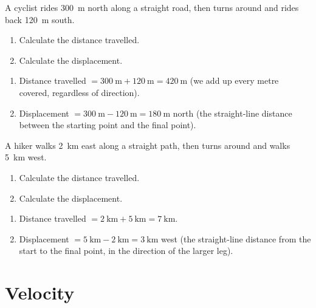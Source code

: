 \begin{exercise}
    A cyclist rides \qty{300}{\m} north along a straight road, then turns around and rides back \qty{120}{\m} south.
    \begin{enumerate}[label=\letraminuscula]
        \item Calculate the distance travelled.
        \item Calculate the displacement.
    \end{enumerate}
    \begin{solu}
        \begin{enumerate}[label=\alph*)]
            \item Distance travelled \(= \qty{300}{\m} + \qty{120}{\m} = \qty{420}{\m}\) (we add up every metre covered, regardless of direction).
            \item Displacement \(= \qty{300}{\m} - \qty{120}{\m} = \qty{180}{\m}\) north (the straight-line distance between the starting point and the final point).
        \end{enumerate}
    \end{solu}
\end{exercise}

\begin{exercise}
    A hiker walks \qty{2}{\km} east along a straight path, then turns around and walks \qty{5}{\km} west.
    \begin{enumerate}[label=\letraminuscula]
        \item Calculate the distance travelled.
        \item Calculate the displacement.
    \end{enumerate}
    \begin{solu}
        \begin{enumerate}[label=\alph*)]
            \item Distance travelled \(= \qty{2}{\km} + \qty{5}{\km} = \qty{7}{\km}\).
            \item Displacement \(= \qty{5}{\km} - \qty{2}{\km} = \qty{3}{\km}\) west (the straight-line distance from the start to the final point, in the direction of the larger leg).
        \end{enumerate}
    \end{solu}
\end{exercise}


\section{Velocity}

